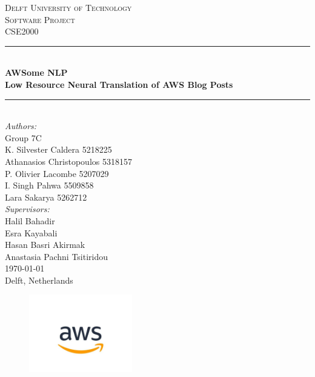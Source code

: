\begin{titlepage}

\newcommand{\HRule}{\rule{\linewidth}{0.5mm}} 							%
\center 
 

\textsc{\LARGE Delft University of Technology}\\[1cm]

\textsc{\Large Software Project}\\[0.2cm]
\textsc{\large CSE2000}\\[1cm] 										%
\HRule \\[0.8cm]
{ \huge \bfseries AWSome NLP}\\[0.7cm]	

\bfseries{Low Resource Neural Translation of AWS Blog Posts}\\[0.5cm]	%
\HRule \\[2cm]
\large
\emph{Authors:}\\
Group 7C \\
K. Silvester Caldera  5218225 \\
Athanasios Christopoulos 5318157 \\ 
P. Olivier Lacombe 5207029  \\
I. Singh Pahwa 5509858   \\
Lara Sakarya 5262712\\[1cm]													%
\emph{Supervisors:}\\
Halil Bahadir \\
Esra Kayabali \\
Hasan Basri Akirmak\\
Anastasia Pachni Tsitiridou \\[1cm]
{\large \today} \\[0.5 cm]
\large Delft, Netherlands\\
\begin{figure}[h]
    \centering
    \centering
    \includegraphics[width=0.4\textwidth]{images/AWS Logo.png}\\ 	%
\end{figure}


\vfill 
\end{titlepage}